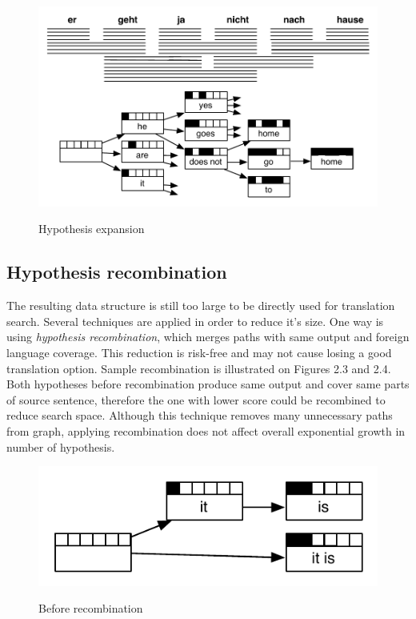 \begin{figure}
 \centering 
 \includegraphics{g/decoding-step5.pdf}
 \caption{Hypothesis expansion}
 \caption*{\textit{\cite{Koehn2009a}}}
\end{figure}

\subsection{Hypothesis recombination}

The resulting data structure is still too large to be directly used for translation search. Several techniques are applied in order to reduce it's size. One way is using \emph{hypothesis recombination}, which merges paths with same output and foreign language coverage. This reduction is risk-free and may not cause losing a good translation option. Sample recombination is illustrated on Figures 2.3 and 2.4. Both hypotheses before recombination produce same output and cover same parts of source sentence, therefore the one with lower score could be recombined to reduce search space. Although this technique removes many unnecessary paths from graph, applying recombination does not affect overall exponential growth in number of hypothesis. 

\begin{figure}
 \centering 
 \includegraphics{g/recombination-example1.pdf}
 \caption{Before recombination}
 \caption*{\textit{\cite{Koehn2009a}}}
\end{figure}


